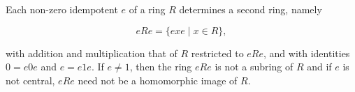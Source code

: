 Each non-zero idempotent $e$ of a ring $R$ determines a second ring, namely

$$eRe = \{exe \mid x \in R\},$$

with addition and multiplication that of $R$ restricted to $eRe$, and with identities $0 = e0e$ and $e = e1e$. If $e \neq 1$, then the ring $eRe$ is not a subring of $R$ and if $e$ is not central, $eRe$ need not be a homomorphic image of $R$.

